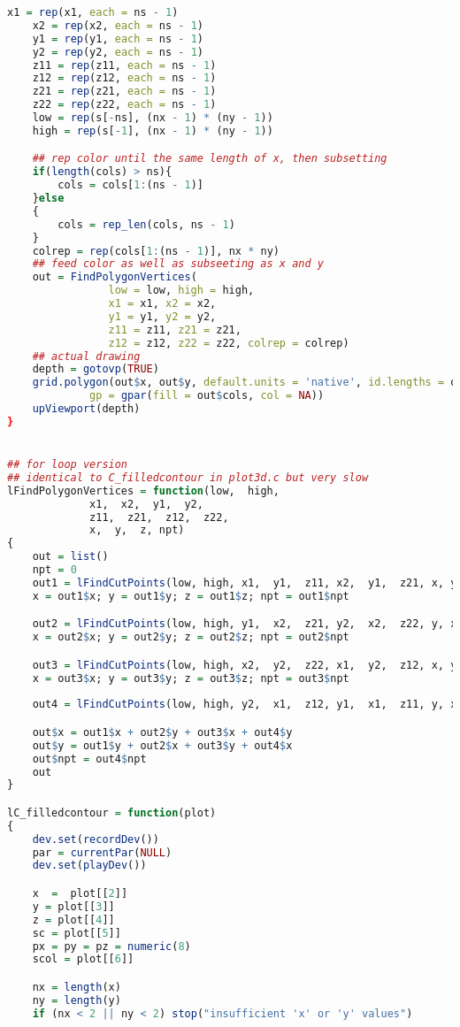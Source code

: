 \begin{lstlisting}[language = R]
    x1 = rep(x1, each = ns - 1)
    x2 = rep(x2, each = ns - 1)
    y1 = rep(y1, each = ns - 1)
    y2 = rep(y2, each = ns - 1)
    z11 = rep(z11, each = ns - 1)
    z12 = rep(z12, each = ns - 1)
    z21 = rep(z21, each = ns - 1)
    z22 = rep(z22, each = ns - 1)
    low = rep(s[-ns], (nx - 1) * (ny - 1))
    high = rep(s[-1], (nx - 1) * (ny - 1))

    ## rep color until the same length of x, then subsetting 
    if(length(cols) > ns){
        cols = cols[1:(ns - 1)]
    }else
    {
        cols = rep_len(cols, ns - 1)
    }
    colrep = rep(cols[1:(ns - 1)], nx * ny)
    ## feed color as well as subseeting as x and y
    out = FindPolygonVertices(
                low = low, high = high,
                x1 = x1, x2 = x2, 
                y1 = y1, y2 = y2,
                z11 = z11, z21 = z21, 
                z12 = z12, z22 = z22, colrep = colrep)
    ## actual drawing
    depth = gotovp(TRUE)
    grid.polygon(out$x, out$y, default.units = 'native', id.lengths = out$id.length,
             gp = gpar(fill = out$cols, col = NA))
    upViewport(depth)
}


## for loop version
## identical to C_filledcontour in plot3d.c but very slow
lFindPolygonVertices = function(low,  high,
		     x1,  x2,  y1,  y2,
		     z11,  z21,  z12,  z22,
		     x,  y,  z, npt)
{
    out = list()
    npt = 0
    out1 = lFindCutPoints(low, high, x1,  y1,  z11, x2,  y1,  z21, x, y, z, npt)
    x = out1$x; y = out1$y; z = out1$z; npt = out1$npt

    out2 = lFindCutPoints(low, high, y1,  x2,  z21, y2,  x2,  z22, y, x, z, npt)
    x = out2$x; y = out2$y; z = out2$z; npt = out2$npt

    out3 = lFindCutPoints(low, high, x2,  y2,  z22, x1,  y2,  z12, x, y, z, npt)
    x = out3$x; y = out3$y; z = out3$z; npt = out3$npt
            
    out4 = lFindCutPoints(low, high, y2,  x1,  z12, y1,  x1,  z11, y, x, z, npt)

    out$x = out1$x + out2$y + out3$x + out4$y
    out$y = out1$y + out2$x + out3$y + out4$x
    out$npt = out4$npt
    out
}

lC_filledcontour = function(plot)
{
    dev.set(recordDev())
    par = currentPar(NULL)
    dev.set(playDev())

    x  =  plot[[2]]
    y = plot[[3]]
    z = plot[[4]]
    sc = plot[[5]]
    px = py = pz = numeric(8)
    scol = plot[[6]]

    nx = length(x)
    ny = length(y)
    if (nx < 2 || ny < 2) stop("insufficient 'x' or 'y' values")


\end{lstlisting}

